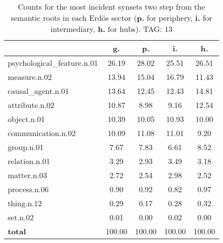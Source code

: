 \begin{table}[h!]
\begin{center}
\begin{tabular}{| l | c | c | c | c |}\hline
 & g. & p. & i. & h. \\\hline
psychological\_feature.n.01 & 26.19  & 28.02  & 25.51  & 26.51 \\\hline
measure.n.02 & 13.94  & 15.04  & 16.79  & 11.43 \\\hline
causal\_agent.n.01 & 13.64  & 12.45  & 12.43  & 14.81 \\\hline
attribute.n.02 & 10.87  & 8.98  & 9.16  & 12.54 \\\hline
object.n.01 & 10.39  & 10.05  & 10.93  & 10.00 \\\hline
communication.n.02 & 10.09  & 11.08  & 11.01  & 9.20 \\\hline
group.n.01 & 7.67  & 7.83  & 6.61  & 8.52 \\\hline
relation.n.01 & 3.29  & 2.93  & 3.49  & 3.18 \\\hline
matter.n.03 & 2.72  & 2.54  & 2.98  & 2.52 \\\hline
process.n.06 & 0.90  & 0.92  & 0.82  & 0.97 \\\hline
thing.n.12 & 0.29  & 0.17  & 0.28  & 0.32 \\\hline
set.n.02 & 0.01  & 0.00  & 0.02  & 0.00 \\\hline
{{\bf total}} & 100.00  & 100.00  & 100.00  & 100.00 \\\hline
\end{tabular}
\caption{Counts for the most incident synsets two step from the semantic roots in each Erd\"os sector ({\bf p.} for periphery, {\bf i.} for intermediary, {\bf h.} for hubs). TAG: 13}
\end{center}
\end{table}